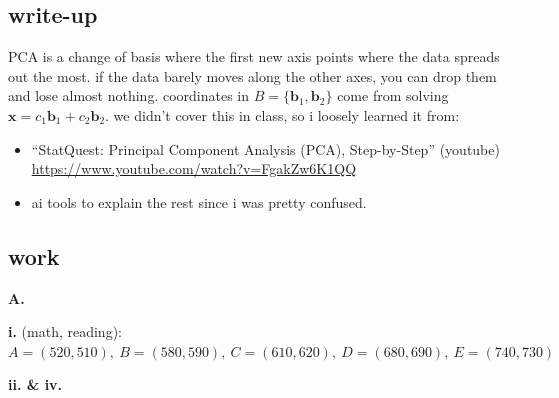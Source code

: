 \documentclass{article}
\begin{document}
\subsection*{write-up}

PCA is a change of basis where the first new axis points where the data spreads out the most.
if the data barely moves along the other axes, you can drop them and lose almost nothing.
coordinates in $B = \{\mathbf{b}_1, \mathbf{b}_2\}$ come from solving $\mathbf{x} = c_1\mathbf{b}_1 + c_2\mathbf{b}_2$.
we didn't cover this in class, so i loosely learned it from:

\begin{itemize}
  \item ``StatQuest: Principal Component Analysis (PCA), Step-by-Step'' (youtube) \\
        \url{https://www.youtube.com/watch?v=FgakZw6K1QQ}

    \item ai tools to explain the rest since i was pretty confused.
\end{itemize}

\subsection*{work}

\textbf{A.}

\textbf{i.} (math, reading):
$A = (520,510),\ B = (580,590),\ C = (610,620),\ D = (680,690),\ E = (740,730)$

\textbf{ii. \& iv.}

\begin{center}
\end{center}
\end{document}
